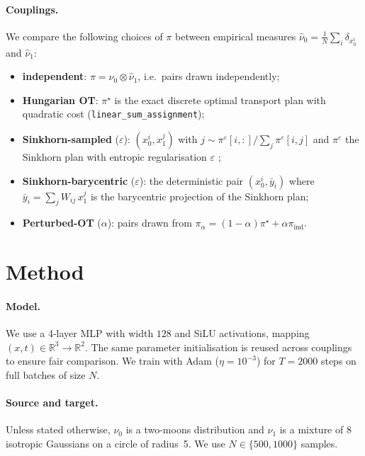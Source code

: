 \documentclass[11pt,a4paper]{article}
\newcommand{\R}{\mathbb{R}}
\begin{document}
\paragraph{Couplings.}
We compare the following choices of $\pi$ between empirical measures
$\hat\nu_0 = \frac{1}{N}\sum_i \delta_{x_0^i}$ and $\hat\nu_1$:
\begin{itemize}
    \item \textbf{independent}: $\pi = \hat\nu_0 \otimes \hat\nu_1$, i.e.\ pairs
          drawn independently;
    \item \textbf{Hungarian OT}: $\pi^\star$ is the exact discrete optimal
          transport plan with quadratic cost (\texttt{linear\_sum\_assignment});
    \item \textbf{Sinkhorn-sampled} ($\varepsilon$): $(x_0^i, x_1^j)$ with
          $j \sim \pi^\varepsilon[i, :] / \sum_j \pi^\varepsilon[i, j]$ and
          $\pi^\varepsilon$ the Sinkhorn plan with entropic regularisation
          $\varepsilon$ \cite{cuturi2013sinkhorn};
    \item \textbf{Sinkhorn-barycentric} ($\varepsilon$): the deterministic pair
          $(x_0^i, \bar y_i)$ where $\bar y_i = \sum_j W_{ij}\, x_1^j$ is the
          barycentric projection of the Sinkhorn plan;
    \item \textbf{Perturbed-OT} ($\alpha$): pairs drawn from
          $\pi_\alpha = (1-\alpha)\pi^\star + \alpha\pi_{\mathrm{ind}}$.
\end{itemize}

\section{Method}
\label{sec:method}

\paragraph{Model.}  We use a 4-layer MLP with width $128$ and SiLU activations,
mapping $(x, t) \in \R^3 \to \R^2$.  The same parameter initialisation
is reused across couplings to ensure fair comparison.  We train with Adam
($\eta = 10^{-3}$) for $T = 2000$ steps on full batches of size $N$.

\paragraph{Source and target.}  Unless stated otherwise, $\nu_0$ is a
two-moons distribution and $\nu_1$ is a mixture of 8 isotropic Gaussians on a
circle of radius~5.  We use $N \in \{500, 1000\}$ samples.
\end{document}
